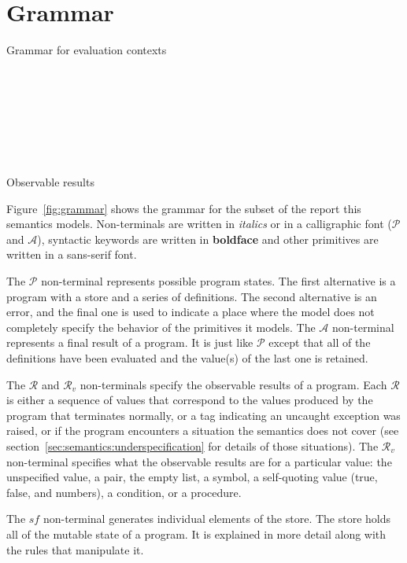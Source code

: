 \section{Grammar}\label{sec:semantics:grammar}

\beginfig

\caption{Grammar for evaluation contexts}\label{fig:ec-grammar}
\endfig

\beginfig
\begin{center}
\parbox{3.8in}{

~

~

~

~
}
\parbox{2.4in}{}
\end{center}
\caption{Observable results}\label{fig:observable}
\endfig


Figure~\ref{fig:grammar} shows the grammar for the subset of the
report this semantics models. Non-terminals are written in
\textit{italics} or in a calligraphic font ($\mathcal{P}$ and
$\mathcal{A}$), syntactic keywords are written in \textbf{boldface} and
other primitives are written in a \textsf{sans-serif} font.

The $\mathcal{P}$ non-terminal represents possible program states. The
first alternative is a program with a store and a series of
definitions. The second alternative is an error, and the final one is
used to indicate a place where the model does not completely specify
the behavior of the primitives it models. The $\mathcal{A}$ non-terminal
represents a final result of a program. It is just like $\mathcal{P}$
except that all of the definitions have been evaluated and the
value(s) of the last one is retained.

The $\mathcal{R}$ and $\mathcal{R}_v$ non-terminals specify the observable results of a program. Each $\mathcal{R}$ is either a sequence of values that correspond to the values produced by the program that terminates normally, or a tag indicating an uncaught exception was raised, or  if the program encounters a situation the semantics does not cover (see section~\ref{sec:semantics:underspecification} for details of those situations). The $\mathcal{R}_v$ non-terminal specifies what the observable results are for a particular value: the unspecified value, a pair, the empty list, a symbol, a self-quoting value (true, false, and numbers), a condition, or a procedure.

The $\mathit{sf}$ non-terminal generates individual elements of the
store. The store holds all of the mutable state of a program. It is
explained in more detail along with the rules that manipulate it.

